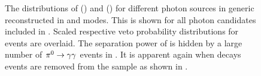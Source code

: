 \begin{figure}[htbp!]
    \centering
    \caption{\label{fig:vetos} The distributions of \piVeto () and \etaVeto () 
    for different photon sources in generic \MC reconstructed in \feiBp and \feiBz modes.
    This is shown for all photon candidates included in .
    Scaled respective veto probability distributions for \BtoXsgamma events are overlaid.
    The separation power of \etaVeto is hidden by a large number of $\pi^0\rightarrow\gamma\gamma$ events in .
    It is apparent again when \piz decays events are removed from the sample as shown in .
    }
\end{figure}

